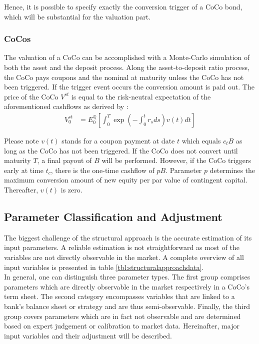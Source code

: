 Hence, it is possible to specify exactly the conversion trigger of a CoCo bond, which will be substantial for the valuation part.

\subsubsection*{CoCos}
The valuation of a CoCo can be accomplished with a Monte-Carlo simulation of both the asset and the deposit process. Along the asset-to-deposit ratio process, the CoCo pays coupons and the nominal at maturity unless the CoCo has not been triggered. If the trigger event occurs the conversion amount is paid out. \citep{wilkens2014contingent} The price of the CoCo $V^{st}$ is equal to the risk-neutral expectation of the aforementioned cashflows as derived by \citet{pennacchi2010structural}:
\begin{align}
V_0^{st} &= E_0^{\mathbb{Q}} \left[ \int_0^T \exp\left(-\int_0^t r_s ds\right) v\left( t \right) dt \right]
\end{align}

Please note $v(t)$ stands for a coupon payment at date $t$ which equals $c_t B$ as long as the CoCo has not been triggered. If the CoCo does not convert until maturity $T$, a final payout of $B$ will be performed. However, if the CoCo triggers early at time $t_c$, there is the one-time cashflow of $pB$. Parameter $p$ determines the maximum conversion amount of new equity per par value of contingent capital. Thereafter, $v(t)$ is zero.

\subsection{Parameter Classification and Adjustment}
The biggest challenge of the structural approach is the accurate estimation of its input parameters. A reliable estimation is not straightforward as most of the variables are not directly observable in the market. \citep{de2014handbook} A complete overview of all input variables is presented in table \ref{tbl:structuralapproachdata}.\\ 

In general, one can distinguish three parameter types. The first group comprises parameters which are directly observable in the market respectively in a CoCo's term sheet. The second category encompasses variables that are linked to a bank's balance sheet or strategy and are thus semi-observable. Finally, the third group covers parameters which are in fact not observable and are determined based on expert judgement or calibration to market data. \citep{wilkens2014contingent} Hereinafter, major input variables and their adjustment will be described.

